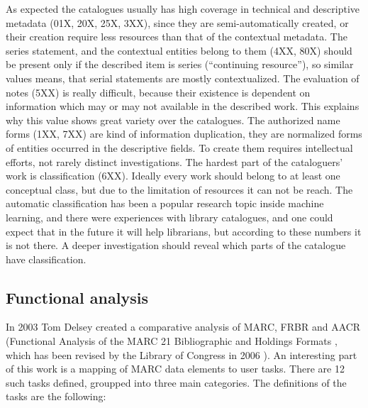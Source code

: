 As expected the catalogues usually has high coverage in technical and descriptive metadata (01X, 20X, 25X, 3XX), since they are semi-automatically created, or their creation require less resources than that of the contextual metadata. The series statement, and the contextual entities belong to them (4XX, 80X) should be present only if the described item is series (``continuing resource''), so similar values means, that serial statements are mostly contextualized. The evaluation of notes (5XX) is really difficult, because their existence is dependent on information which may or may not available in the described work. This explains why this value shows great variety over the catalogues. The authorized name forms (1XX, 7XX) are kind of information duplication, they are normalized forms of entities occurred in the descriptive fields. To create them requires intellectual efforts, not rarely distinct investigations. The hardest part of the cataloguers' work is classification (6XX). Ideally every work should belong to at least one conceptual class, but due to the limitation of resources it can not be reach. The automatic classification has been a popular research topic inside machine learning, and there were experiences with library catalogues, and one could expect that in the future it will help librarians, but according to these numbers it is not there. A deeper investigation should reveal which parts of the catalogue have classification.

\subsection{Functional analysis}

In 2003 Tom Delsey created a comparative analysis of MARC, FRBR and AACR (Functional Analysis of the MARC 21 Bibliographic and Holdings Formats \cite{delsey2003}, which has been revised by the Library of Congress in 2006 \cite{loc2006}). An interesting part of this work is a mapping of MARC data elements to user tasks. There are 12 such tasks defined, groupped into three main categories. The definitions of the tasks are the following:

